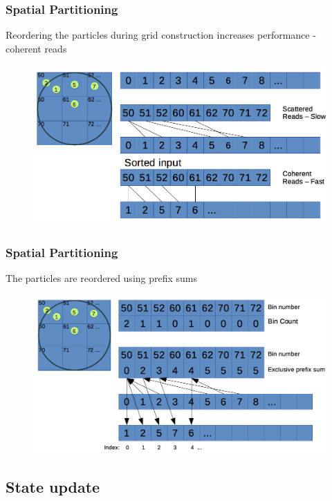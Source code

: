 \documentclass{beamer}
\begin{document}
	\begin{frame}
		\frametitle{Spatial Partitioning}
		Reordering the particles during grid construction increases performance - coherent reads
		\begin{figure}
			\includegraphics[width=0.7\linewidth]{fig/prefix1.png}
		\end{figure}
	\end{frame}

	\begin{frame}
		\frametitle{Spatial Partitioning}
		The particles are reordered using prefix sums\\
		\begin{figure}
			\includegraphics[width=0.7\linewidth]{fig/prefix2.png}
		\end{figure}
	\end{frame}

	\subsection{State update}
\end{document}
